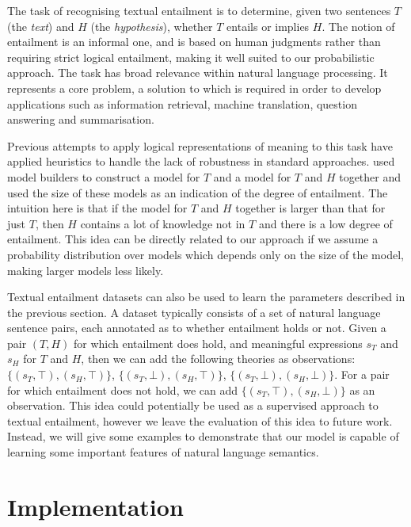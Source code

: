 \documentclass[letterpaper]{article}
\newcommand{\citet}[1]{\citeauthor{#1} \shortcite{#1}}
\begin{document}
The task of recognising textual entailment \cite{Dagan:05} is to
determine, given two sentences $T$ (the \emph{text}) and $H$ (the
\emph{hypothesis}), whether $T$ entails or implies $H$. The notion of
entailment is an informal one, and is based on human judgments rather
than requiring strict logical entailment, making it well suited to our
probabilistic approach. The task has broad relevance within natural language processing. 
It represents a core problem, a solution to which is required in order to develop applications such as
information retrieval, machine translation, question answering and
summarisation.

Previous attempts to apply logical representations of meaning to this
task have applied heuristics to handle the lack of robustness in
standard approaches. \citet{Bos:06} used model builders to construct a
model for $T$ and a model for $T$ and $H$ together and used the size
of these models as an indication of the degree of entailment. The
intuition here is that if the model for $T$ and $H$ together is larger
than that for just $T$, then $H$ contains a lot of knowledge not in
$T$ and there is a low degree of entailment.  This idea can be
directly related to our approach if we assume a probability
distribution over models which depends only on the size of the model,
making larger models less likely.

Textual entailment datasets can also be used to learn the parameters
described in the previous section. A dataset typically consists of a
set of natural language sentence pairs, each annotated as to whether
entailment holds or not. Given a pair $(T,H)$ for which entailment
does hold, and meaningful expressions $s_T$ and $s_H$ for $T$ and $H$,
then we can add the following theories as observations:
$\{(s_T,\top),(s_H,\top)\}$, $\{(s_T,\bot),(s_H,\top)\}$,
$\{(s_T,\bot),(s_H,\bot)\}$. For a pair for which entailment does not
hold, we can add $\{(s_T,\top),(s_H,\bot)\}$ as an observation. This
idea could potentially be used as a supervised approach to textual
entailment, however we leave the evaluation of this idea to future
work. Instead, we will give some examples to demonstrate that our
model is capable of learning some important features of natural
language semantics.

\section{Implementation}
\end{document}

